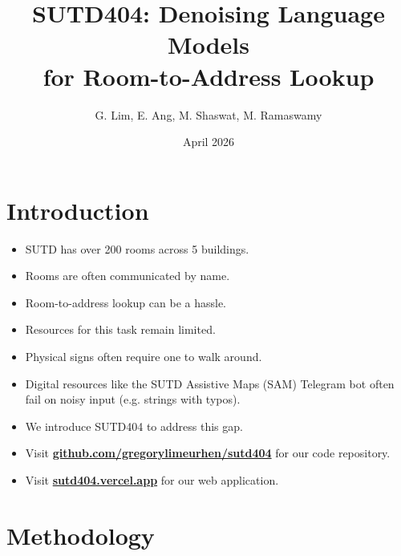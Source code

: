 \documentclass[aspectratio=169,notheorems,10pt]{beamer}
\title{SUTD404: Denoising Language Models\\for Room-to-Address Lookup}
\author{
	G. Lim,
	E. Ang,
	M. Shaswat,
	M. Ramaswamy
}
\date{April 2026}
\theoremstyle{definition}
\let\oldhref\href
\renewcommand{\href}[2]{\oldhref{#1}{\textbf{#2}}}
\begin{document}
\maketitle

\section{Introduction}
\begin{frame}
\begin{itemize}
	\item SUTD has over 200 rooms across 5 buildings.
	\item Rooms are often communicated by name.
	\item Room-to-address lookup can be a hassle.
\end{itemize}
\end{frame}

\begin{frame}
\begin{itemize}
	\item Resources for this task remain limited.
	\item Physical signs often require one to walk around.
	\item Digital resources like the SUTD Assistive Maps (SAM) Telegram bot often fail on noisy input (e.g. strings with typos).
\end{itemize}
\end{frame}

\begin{frame}
\begin{itemize}
	\item We introduce SUTD404 to address this gap.
	\item Visit \href{https://github.com/gregorylimeurhen/sutd404}{github.com/gregorylimeurhen/sutd404} for our code repository.
	\item Visit \href{https://sutd404.vercel.app}{sutd404.vercel.app} for our web application.
\end{itemize}
\end{frame}

\section{Methodology}
\end{document}
